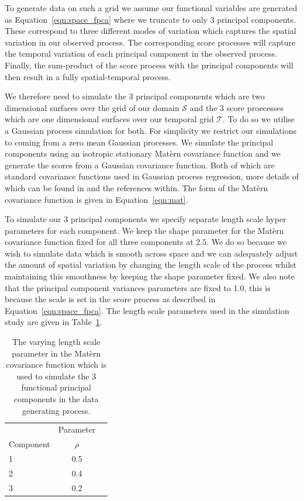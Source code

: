 To generate data on such a grid we assume our functional variables are generated as Equation~\ref{eqn:space_fpca} where we truncate to only $3$ principal components.
These correspond to three different modes of variation which captures the spatial variation in our observed process.
The corresponding score processes will capture the temporal variation of each principal component in the observed process.
Finally, the sum-product of the score process with the principal components will then result in a fully spatial-temporal process. 

We therefore need to simulate the $3$ principal components which are two dimensional surfaces over the grid of our domain $\mathcal{S}$ and the $3$ score proecesses which are one dimensional surfaces over our temporal grid $\mathcal{T}$.
To do so we utilise a Gaussian process simulation for both.
For simplicity we restrict our simulations to coming from a zero mean Gaussian processes.
We simulate the principal components using an isotropic stationary Mat\`{e}rn covariance function and we generate the scores from a Gaussian covariance function.
Both of which are standard covariance functions used in Gaussian process regression, more details of which can be found in \citep{williams_gaussian_2006} and the references within.
The form of the Mat\`{e}rn covariance function is given in Equation~\ref{eqn:mat}. 

To simulate our $3$ principal components we specify separate length scale hyper parameters for each component. 
We keep the shape parameter for the Mat\`{e}rn covariance function fixed for all three components at $2.5$. 
We do so because we wish to simulate data which is smooth across space and we can adequately adjust the amount of spatial variation by changing the length scale of the process whilst maintaining this smoothness by keeping the shape parameter fixed.
We also note that the principal component variances parameters are fixed to 1.0, this is because the scale is set in the score process as described in Equation~\ref{eqn:space_fpca}.
The length scale parameters used in the simulation study are given in Table~\ref{tab:fpc_params}.

\begin{table}[htbp!] 
	\caption[Parameters for simulating functional principal component processes.]{The varying length scale parameter in the Mat\`{e}rn covariance function which is used to simulate the $3$ functional principal components in the data generating process.}
	\centering
	\label{tab:fpc_params}
	\begin{tabular}{l c c }
		\toprule
		& \multicolumn{1}{c}{Parameter} \\ 
		Component  & $\rho$ \\
		\midrule
		1 & 0.5 \\
		2 & 0.4 \\
		3 & 0.2 \\
		\bottomrule
	\end{tabular}
\end{table}

